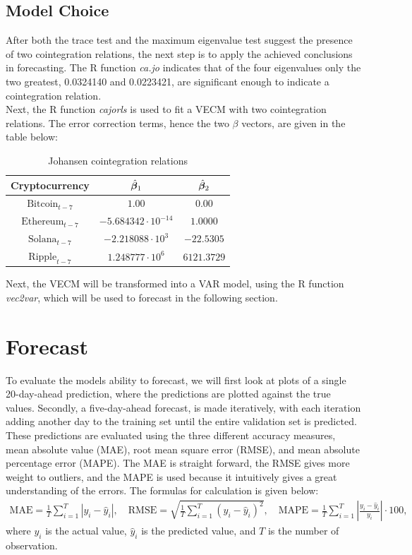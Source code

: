 \subsection{Model Choice}
After both the trace test and the maximum eigenvalue test suggest the presence of two cointegration relations, the next step is to apply the achieved conclusions in forecasting. The R function \textit{ca.jo} indicates that of the four eigenvalues only the two greatest, 0.0324140 and 0.0223421, are significant enough to indicate a cointegration relation.\\
Next, the R function \textit{cajorls} is used to fit a VECM with two cointegration relations. The error correction terms, hence the two $\beta$ vectors, are given in the table below:\\
\begin{table}[h!]
\centering
\begin{tabular}{|c|c|c|}
\hline
\textbf{Cryptocurrency} & $\hat{\boldsymbol{\beta}}_1$ & $\hat{\boldsymbol{\beta}}_2$ \\ \hline
 $\text{Bitcoin}_{t-7}$  & $1.00$  & $0.00$      \\ \hline
 $\text{Ethereum}_{t-7}$  & $-5.684342 \cdot 10^{-14}$ & $1.0000$    \\\hline
 $\text{Solana}_{t-7}$  & $-2.218088 \cdot 10^3$ & $-22.5305$    \\ \hline
 $\text{Ripple}_{t-7}$  & $1.248777 \cdot 10^6$  & $6121.3729$   \\ \hline
\end{tabular}
\caption{Johansen cointegration relations}
\label{tab:ect_coefficients}
\end{table}

\noindent Next, the VECM will be transformed into a VAR model, using the R function \textit{vec2var}, which will be used to forecast in the following section.



\section{Forecast}
To evaluate the models ability to forecast, we will first look at plots of a single 20-day-ahead prediction, where the predictions are plotted against the true values. Secondly, a five-day-ahead forecast, is made iteratively, with each iteration adding another day to the training set until the entire validation set is predicted. These predictions are evaluated using the three different accuracy measures, mean absolute value (MAE), root mean square error (RMSE), and mean absolute percentage error (MAPE). The MAE is straight forward, the RMSE gives more weight to outliers, and the MAPE is used because it intuitively gives a great understanding of the errors. The formulas for calculation is given below:
\begin{align*}
    \text{MAE} = \frac{1}{T} \sum_{i=1}^{T} |y_i - \hat{y}_i|, \quad \text{RMSE} = \sqrt{\frac{1}{T} \sum_{i=1}^{T} (y_i - \hat{y}_i)^2}, \quad \text{MAPE} = \frac{1}{T} \sum_{i=1}^{T} \left| \frac{y_i - \hat{y}_i}{y_i} \right|\cdot 100,
\end{align*}
\noindent where $y_i$ is the actual value, $\hat{y}_i$ is the predicted value, and $T$ is the number of observation.

